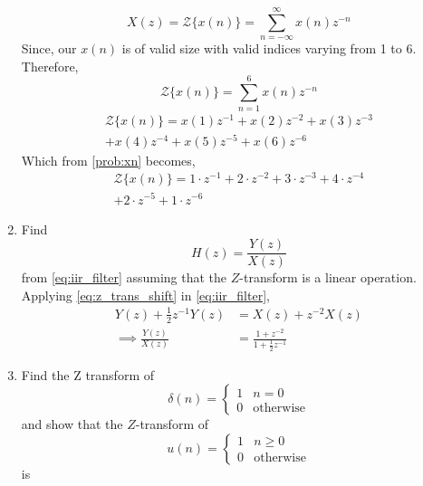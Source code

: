 \documentclass[journal,12pt,twocolumn]{IEEEtran}
\renewcommand\thesection{\arabic{section}}
\begin{document}
\begin{enumerate}[label=\thesection.\arabic*]
\begin{equation*}
	X(z)={\mathcal {Z}}\{x(n)\}=\sum _{n=-\infty }^{\infty }x(n)z^{-n}
\end{equation*}
Since, our $x(n)$ is of valid size with valid indices varying from 1 to 6. Therefore,
\begin{equation}
	{\mathcal {Z}}\{x(n)\}=\sum _{n=1 }^{6 }x(n)z^{-n}
\end{equation}
\begin{multline}
	{\mathcal {Z}}\{x(n)\}=x(1)z^{-1} + x(2)z^{-2} + x(3)z^{-3} \\ + x(4)z^{-4} 
	+ x(5)z^{-5} + x(6)z^{-6}
\end{multline}
Which from \eqref{prob:xn} becomes,
\begin{multline}
	{\mathcal{Z}}\{x(n)\} = 1\cdot z^{-1} + 2\cdot z^{-2} + 3\cdot z^{-3} + 4\cdot z^{-4} \\+ 2\cdot z^{-5} + 1\cdot z^{-6}  
\end{multline}
\item Find
%
\begin{equation}
	H(z) = \frac{Y(z)}{X(z)}
\end{equation}
%
from  \eqref{eq:iir_filter} assuming that the $Z$-transform is a linear operation.
\\
\solution  Applying \eqref{eq:z_trans_shift} in \eqref{eq:iir_filter},
\begin{align}
	Y(z) + \frac{1}{2}z^{-1}Y(z) &= X(z)+z^{-2}X(z)\\
	\implies \frac{Y(z)}{X(z)} &= \frac{1 + z^{-2}}{1 + \frac{1}{2}z^{-1}}
	\label{eq:freq_resp}
\end{align}
%
\item Find the Z transform of 
\begin{equation}
	\delta(n)
	=
	\begin{cases}
		1 & n = 0
		\\
		0 & \text{otherwise}
	\end{cases}
\end{equation}
and show that the $Z$-transform of
\begin{equation}
	\label{eq:unit_step}
	u(n)
	=
	\begin{cases}
		1 & n \ge 0
		\\
		0 & \text{otherwise}
	\end{cases}
\end{equation}
is
\begin{equation}

\end{equation}
\end{enumerate}
\end{document}
